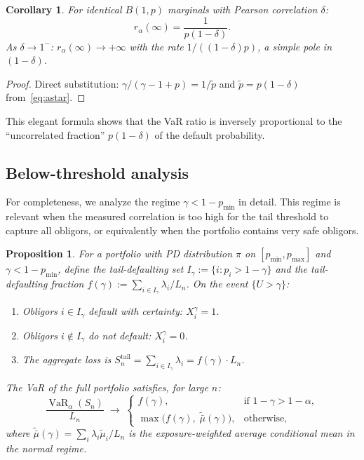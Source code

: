 \documentclass[11pt]{article}
\newtheorem{proposition}[theorem]{Proposition}
\newtheorem{corollary}[theorem]{Corollary}
\theoremstyle{definition}
\newcommand{\VaR}{\operatorname{VaR}}
\newcommand{\1}{\mathbf{1}}
\begin{document}
\begin{corollary}\label{cor:phase_delta}
For identical $B(1,p)$ marginals with Pearson correlation $\delta$:
\begin{equation}\label{eq:ratio_delta}
  r_\alpha(\infty) = \frac{1}{p(1-\delta)}.
\end{equation}
As $\delta \to 1^-$: $r_\alpha(\infty) \to +\infty$ with the rate $1/((1-\delta)p)$, a simple pole in $(1-\delta)$.
\end{corollary}

\begin{proof}
Direct substitution: $\gamma/({\gamma - 1 + p}) = 1/\tilde{p}$ and $\tilde{p} = p(1-\delta)$ from~\eqref{eq:astar}.
\end{proof}

This elegant formula shows that the VaR ratio is inversely proportional to the ``uncorrelated fraction'' $p(1-\delta)$ of the default probability.

\subsection{Below-threshold analysis}\label{sec:below_threshold}

For completeness, we analyze the regime $\gamma < 1 - p_{\min}$ in detail. This regime is relevant when the measured correlation is too high for the tail threshold to capture all obligors, or equivalently when the portfolio contains very safe obligors.

\begin{proposition}\label{prop:below_threshold}
For a portfolio with PD distribution $\pi$ on $[p_{\min}, p_{\max}]$ and $\gamma < 1 - p_{\min}$, define the tail-defaulting set $I_\gamma := \{i : p_i > 1 - \gamma\}$ and the tail-defaulting fraction $f(\gamma) := \sum_{i \in I_\gamma} \lambda_i / L_n$. On the event $\{U > \gamma\}$:
\begin{enumerate}[label=(\roman*)]
  \item Obligors $i \in I_\gamma$ default with certainty: $X_i^\gamma = 1$.
  \item Obligors $i \notin I_\gamma$ do not default: $X_i^\gamma = 0$.
  \item The aggregate loss is $S_n^{\mathrm{tail}} = \sum_{i \in I_\gamma} \lambda_i = f(\gamma) \cdot L_n$.
\end{enumerate}
The VaR of the full portfolio satisfies, for large $n$:
\begin{equation}\label{eq:var_below}
  \frac{\VaR_\alpha(S_n)}{L_n} \;\to\; \begin{cases}
    f(\gamma), & \text{if } 1 - \gamma > 1 - \alpha, \\
    \max\!\bigl(f(\gamma),\; \tilde{\bar{\mu}}(\gamma)\bigr), & \text{otherwise},
  \end{cases}
\end{equation}
where $\tilde{\bar{\mu}}(\gamma) = \sum_i \lambda_i \tilde{\mu}_i / L_n$ is the exposure-weighted average conditional mean in the normal regime.
\end{proposition}
\end{document}
